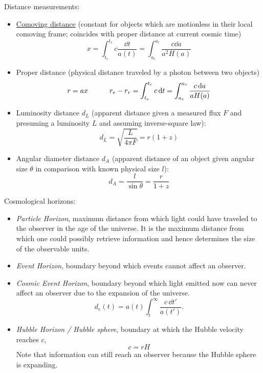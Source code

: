 		\noindent
		Distance measurements:
		\begin{itemize}
			\item \href{https://en.wikipedia.org/wiki/Comoving_and_proper_distances}{Comoving distance} (constant for objects which are motionless in their local comoving frame; coincides with proper distance at current cosmic time)
				\begin{equation}
					x = \int_{t_e}^{t_r} c\frac{\dd t}{a(t)}
					= \int_{a_e}^{a_r} \frac{c \dd a}{a^2 H(a)}
				\end{equation}
			\item Proper distance (physical distance traveled by a photon between two objects)
				\begin{equation}
					r = a x
					\hspace{30pt}
					r_e - r_r = \int_{t_e}^{t_r} c \,\dd t
					= \int_{a_e}^{a_r} \frac{c\, \dd a}{a H(a)}
				\end{equation}
			\item Luminosity distance $d_L$ (apparent distance given a measured flux $F$ and presuming a luminosity $L$ and assuming inverse-square law):
				\begin{equation}
					d_L = \sqrt{\frac{L}{4 \pi F}} = r (1+z)
				\end{equation}
			\item Angular diameter distance $d_A$ (apparent distance of an object given angular size $\theta$ in comparison with known physical size $l$):
				\begin{equation}
					d_A = \frac{l}{\sin \theta} = \frac{r}{1+z}
				\end{equation}
		\end{itemize}


		\noindent
		Cosmological horizons:
		\begin{itemize}
			\item \emph{Particle Horizon}, maximum distance from which light could have traveled to the observer in the age of the universe. It is the maximum distance from which one could possibly retrieve information and hence determines the size of the observable units.
			\item \emph{Event Horizon}, boundary beyond which events cannot affect an observer.
			\item \emph{Cosmic Event Horizon}, boundary beyond which light emitted now can never affect an observer due to the expansion of the universe.
				\begin{equation}
					d_e(t) = a(t) \int^{\infty}_{t} \frac{c \,\dd t'}{a(t')}.
				\end{equation}
			\item \emph{Hubble Horizon / Hubble sphere}, boundary at which the Hubble velocity reaches $c$,
				\begin{equation}
					c = r H
				\end{equation}
				Note that information can still reach an observer because the Hubble sphere is expanding.
		\end{itemize}

